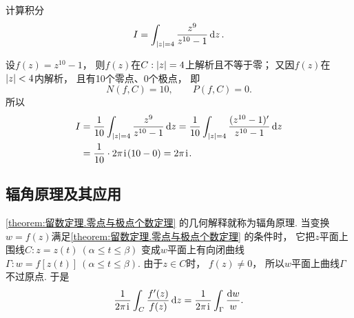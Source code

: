 \begin{example}
计算积分\[
	I = \int_{\abs{z}=4} \frac{z^9}{z^{10}-1} \dd{z}.
\]
\begin{solution}
设\(f(z) = z^{10}-1\)，
则\(f(z)\)在\(C: \abs{z}=4\)上解析且不等于零；
又因\(f(z)\)在\(\abs{z}<4\)内解析，
且有10个零点、0个极点，
即\[
	N(f,C) = 10, \qquad P(f,C) = 0.
\]
所以\begin{align*}
	I &= \frac{1}{10} \int_{\abs{z}=4} \frac{z^9}{z^{10}-1} \dd{z}
	= \frac{1}{10} \int_{\abs{z}=4} \frac{(z^{10}-1)'}{z^{10}-1} \dd{z} \\
	&= \frac{1}{10} \cdot 2\pi\kern1pt\mathrm{i}\kern1pt (10-0) = 2\pi\kern1pt\mathrm{i}\kern1pt.
\end{align*}
\end{solution}
\end{example}

\subsection{辐角原理及其应用}
\cref{theorem:留数定理.零点与极点个数定理} 的几何解释就称为辐角原理.
当变换\(w = f(z)\)满足\cref{theorem:留数定理.零点与极点个数定理} 的条件时，
它把\(z\)平面上围线\(C: z = z(t)\ (\alpha \leq t \leq \beta)\)
变成\(w\)平面上有向闭曲线\(\Gamma: w = f[z(t)]\ (\alpha \leq t \leq \beta)\).
由于\(z \in C\)时，
\(f(z)\neq0\)，
所以\(w\)平面上曲线\(\Gamma\)不过原点.
于是\begin{equation}\label{equation:留数定理.辐角原理及其应用1}
	\frac{1}{2\pi\kern1pt\mathrm{i}\kern1pt} \int_C \frac{f'(z)}{f(z)} \dd{z}
	= \frac{1}{2\pi\kern1pt\mathrm{i}\kern1pt} \int_\Gamma \frac{\dd{w}}{w}.
\end{equation}

